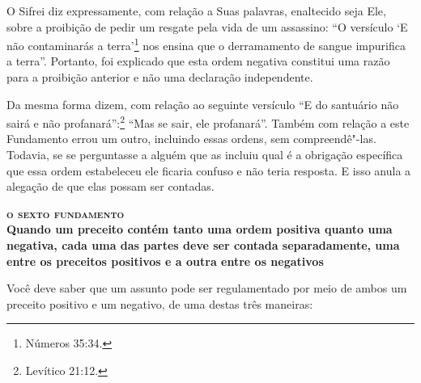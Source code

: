 O Sifrei\starr{} diz expressamente, com relação a Suas palavras, enaltecido seja
Ele, sobre a proibição de pedir um resgate pela vida de um assassino:
``O versículo `E não contaminarás a terra'\footnote{Números 35:34.} nos ensina
que o derramamento de sangue impurifica a terra''. Portanto, foi
explicado que esta ordem negativa constitui uma razão para a proibição
anterior e não uma declaração independente.


Da mesma forma dizem, com relação ao seguinte versículo ``E do
santuário não sairá e não profanará'':\footnote{Levítico 21:12.} ``Mas se sair,
ele profanará''.
Também com relação a este Fundamento errou um outro, incluindo essas
ordens, sem compreendê"-las. Todavia, se se perguntasse a alguém que as
incluiu qual é a obrigação específica que essa ordem estabeleceu ele
ficaria confuso e não teria resposta. E isso anula a alegação de que
elas possam ser contadas.


\bigskip

\noindent\textbf{\textsc{o sexto fundamento}\\Quando um preceito contém tanto uma ordem positiva quanto uma negativa, cada uma das partes deve ser contada separadamente, uma entre os preceitos positivos e a outra entre os negativos}

\smallskip

Você deve saber que um assunto pode ser regulamentado por meio de ambos
um preceito positivo e um negativo, de uma destas três maneiras:

